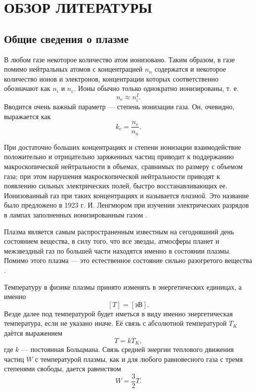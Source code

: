 \chapter{ОБЗОР ЛИТЕРАТУРЫ}\label{ch1}

\section{Общие сведения о плазме}

В любом газе некоторое количество атом ионизовано. Таким образом, в газе помимо нейтральных атомов с концентрацией $n_n$ содержатся и некоторое количество ионов и электронов, концентрации которых соответственно обозначают как $n_i$ и $n_e$. Ионы обычно только однократно ионизированы, т. е.
\begin{equation}
n_e \approx n_i^I.
\end{equation}
Вводится очень важный параметр --- степень ионизации газа. Он, очевидно, выражается как
\begin{equation}
k_c = \frac{n_e}{n_n}.
\end{equation}

При достаточно больших концентрациях и степени ионизации взаимодействие положительно и отрицательно заряженных частиц приводит к поддержанию макроскопической нейтральности в объемах, сравнимых по размеру с объемом газа; при этом нарушения макроскопической нейтральности приводят к появлению сильных электрических полей, быстро восстанавливающих ее. Ионизованный газ при таких концентрациях и называется \textit{плазмой}. Это название было предложено в 1923 г. И. Ленгмюром при изучении электрических разрядов в лампах заполненных ионизированным газом \cite{golant,kotelnikov2008}.


Плазма является самым распространенным известным на сегодняшний день состоянием вещества, в силу того, что все звезды, атмосферы планет и межзвездный газ по большей части находятся именно в состоянии плазмы. Помимо этого плазма --- это естественное состояние сильно разогретого вещества \cite{golant,archenovich}.

Температуру в физике плазмы принято изменять в энергетических единицах, а именно
\begin{equation}
\left[T\right] = \left[\text{эВ}\right].
\end{equation}
Везде далее под температурой будет иметься в виду именно энергетическая температура, если не указано иначе. Её связь с абсолютной температурой $T_K$ даётся выражением
\begin{equation}
T = k T_K,
\end{equation}
где $k$ --- постоянная Больцмана. Связь средней энергии теплового движения частиц $W$ с температурой плазмы, как и для любого равновесного газа с тремя степенями свободы, дается равенством
\begin{equation}
W = \frac{3}{2} T.
\end{equation}


